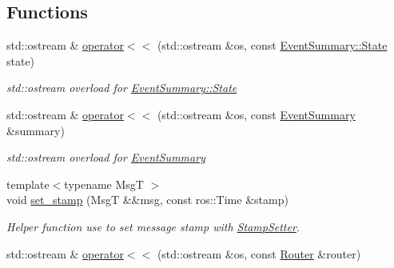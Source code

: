 \subsection*{Functions}
\begin{DoxyCompactItemize}
\item 
\mbox{\label{namespaceflow__ros_ad76192ea6b5dd08c4f62103100a1617a}} 
std\+::ostream \& \hyperlink{namespaceflow__ros_ad76192ea6b5dd08c4f62103100a1617a}{operator$<$$<$} (std\+::ostream \&os, const \hyperlink{structflow__ros_1_1_event_summary_a9b5a677b4629e3c40e36a49a3f2cea6b}{Event\+Summary\+::\+State} state)
\begin{DoxyCompactList}\small\item\em {\ttfamily std\+::ostream} overload for \hyperlink{structflow__ros_1_1_event_summary_a9b5a677b4629e3c40e36a49a3f2cea6b}{Event\+Summary\+::\+State} \end{DoxyCompactList}\item 
\mbox{\label{namespaceflow__ros_ade26b7351522105c37efd1ffd119c984}} 
std\+::ostream \& \hyperlink{namespaceflow__ros_ade26b7351522105c37efd1ffd119c984}{operator$<$$<$} (std\+::ostream \&os, const \hyperlink{structflow__ros_1_1_event_summary}{Event\+Summary} \&summary)
\begin{DoxyCompactList}\small\item\em {\ttfamily std\+::ostream} overload for \hyperlink{structflow__ros_1_1_event_summary}{Event\+Summary} \end{DoxyCompactList}\item 
{\footnotesize template$<$typename MsgT $>$ }\\void \hyperlink{namespaceflow__ros_a4ee9a96308b9612ffbf1c133dacd91e2}{set\+\_\+stamp} (MsgT \&\&msg, const ros\+::\+Time \&stamp)
\begin{DoxyCompactList}\small\item\em Helper function use to set message stamp with \hyperlink{structflow__ros_1_1_stamp_setter}{Stamp\+Setter}. \end{DoxyCompactList}\item 
std\+::ostream \& \hyperlink{namespaceflow__ros_a5adebd2e59fa0a6e7b11c442a46a445b}{operator$<$$<$} (std\+::ostream \&os, const \hyperlink{classflow__ros_1_1_router}{Router} \&router)
\end{DoxyCompactItemize}
